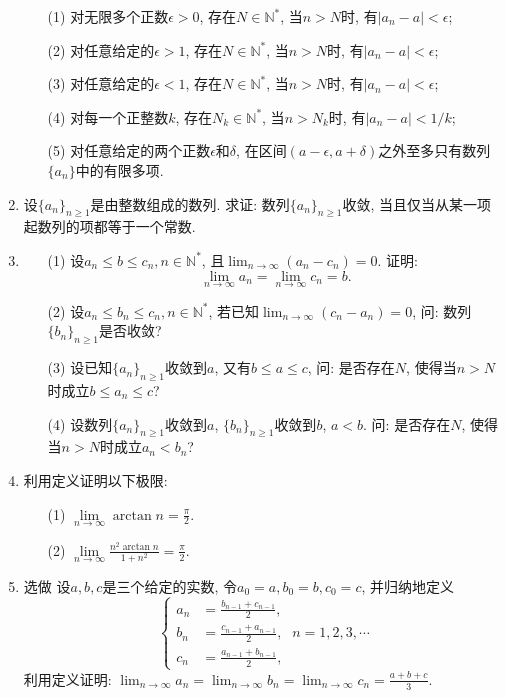 \documentclass[UTF8,11pt, a4paper, oneside, fontset=none]{ctexbook}
\begin{document}
\begin{enumerate}
\begin{itemize}
\item[(1)] 对无限多个正数$\epsilon>0$, 存在$N \in \mathbb N^*$, 当$n >N$时, 有$|a_n - a|< \epsilon$;
\item[(2)] 对任意给定的$\epsilon >1$, 存在$N \in \mathbb N^*$, 当$n >N$时, 有$|a_n - a|< \epsilon$;
\item[(3)] 对任意给定的$\epsilon <1$, 存在$N \in \mathbb N^*$, 当$n >N$时, 有$|a_n - a|< \epsilon$;
\item[(4)] 对每一个正整数$k$, 存在$N_k \in \mathbb N^*$, 当$n >N_k$时, 有$|a_n - a|< 1/k$;
\item[(5)] 对任意给定的两个正数$\epsilon$和$\delta$, 在区间$(a-\epsilon, a+\delta)$之外至多只有数列$\{ a_n \}$中的有限多项.
\end{itemize}

\item 设$\{ a_n \}_{n \geq 1}$是由整数组成的数列. 求证: 数列$\{ a_n \}_{n \geq 1}$收敛, 当且仅当从某一项起数列的项都等于一个常数.

\item
\begin{itemize}
\item[(1)] 设$a_n \leq b \leq c_n, n \in \mathbb N^*$, 且$\lim_{n \to \infty} (a_n - c_n) =0$. 证明:
\[
\lim_{n \to \infty} a_n = \lim_{n \to \infty} c_n = b.
\]
\item[(2)] 设$a_n \leq b_n \leq c_n, n \in \mathbb N^*$, 若已知$\lim_{n \to \infty}(c_n -a_n) =0$, 问: 数列$\{b_n\}_{n \geq 1}$是否收敛?
\item[(3)] 设已知$\{a_n\}_{n \geq 1}$收敛到$a$, 又有$b \leq a \leq c$, 问: 是否存在$N$, 使得当$n >N$时成立$b \leq a_n \leq c$?
\item[(4)] 设数列$\{a_n\}_{n \geq 1}$收敛到$a$, $\{b_n\}_{n \geq 1}$收敛到$b$, $a < b$. 问: 是否存在$N$, 使得当$n >N$时成立$a_n < b_n$?

\end{itemize}

\item 利用定义证明以下极限:
\begin{itemize}
\item[(1)] $\lim\limits_{n \to \infty} \arctan n = \frac{\pi}{2}$.
\item[(2)] $\lim\limits_{n \to \infty} \frac{n^2 \arctan n}{1+n^2} = \frac{\pi}{2}$. 
\end{itemize}

\item {\color{red} 选做} 设$a, b, c$是三个给定的实数, 令$a_0 =a, b_0 =b, c_0 =c$, 并归纳地定义
\[\begin{cases}
a_n &= \frac{b_{n-1} + c_{n-1}}{2},\\
b_n &= \frac{c_{n-1} + a_{n-1}}{2},\\
c_n &= \frac{a_{n-1} + b_{n-1}}{2},
\end{cases} \ n = 1, 2, 3, \cdots
\]
利用定义证明: $\lim_{n \to \infty}a_n = \lim_{n \to \infty}b_n=\lim_{n \to \infty}c_n = \frac{a+b+c}{3}$.

\end{enumerate}
\clearpage
\end{document}

